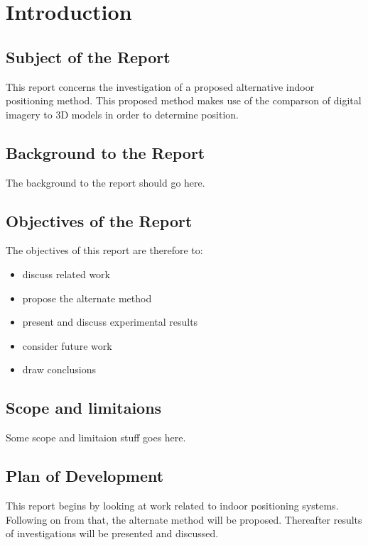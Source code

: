 \documentclass[11pt,a4paper]{article}
\begin{document}
\newpage
\tableofcontents

\setcounter{page}{0}

\newpage
\section{Introduction}
	\subsection{Subject of the Report}
		This report concerns the investigation of a proposed alternative indoor positioning method. This proposed method makes use of the comparson of digital imagery to 3D models in order to determine position.
	
	\subsection{Background to the Report}
		The background to the report should go here.
	
	\subsection{Objectives of the Report}
		The objectives of this report are therefore to:
		\begin{itemize}
			\item
				discuss related work
			\item
				propose the alternate method
			\item
				present and discuss experimental results
			\item
				 consider future work
			\item
				draw conclusions
		\end{itemize}
	
	\subsection{Scope and limitaions}
		Some scope and limitaion stuff goes here.
	
	\subsection{Plan of Development}
		This report begins by looking at work related to indoor positioning systems. Following on from that, the alternate method will be proposed. Thereafter results of investigations will be presented and discussed.
\end{document}
